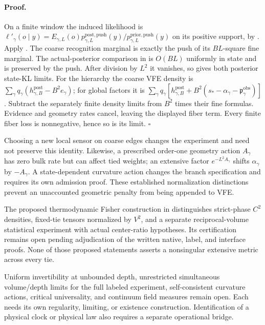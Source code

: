 \paragraph{Proof.}
On a finite window the induced likelihood is
$\ell'_\gamma(o\mid y)=E_{\gamma,L}(o)
 p_{\gamma,L}^{\mathrm{post,push}}(y)/p_{\gamma,L}^{\mathrm{prior,push}}(y)$
on its positive support, by .
Apply . The coarse recognition marginal
is exactly the push of its $BL$-square fine marginal. The actual-posterior
comparison in  is $O(BL)$ uniformly in
state and is preserved by the push. After division by $L^2$ it vanishes,
so  gives both posterior state-KL
limits. For the hierarchy the coarse VFE density is
$\sum_\gamma q_\gamma(h^{\mathrm{post}}_{\gamma,B}-B^2e_\gamma)$;
for global factors it is
$\sum_\gamma q_\gamma[h^{\mathrm{post}}_{\gamma,B}
 +B^2(s_*-\alpha_\gamma-\mathfrak p_\gamma^{\mathrm{obs}})]$.
Subtract the separately finite density limits from $B^2$ times their fine
formulas. Evidence and geometry rates cancel, leaving the displayed fiber
term. Every finite fiber loss is nonnegative, hence so is its limit.
$\square$

Choosing a new local sensor on coarse edges changes the experiment and
need not preserve this identity. Likewise, a prescribed order-one
geometry action $A_\gamma$ has zero bulk rate but can affect tied weights;
an extensive factor $e^{-L^2A_\gamma}$ shifts $\alpha_\gamma$ by
$-A_\gamma$. A state-dependent curvature action changes the branch
specification and requires its own admission proof. These established
normalization distinctions prevent an unaccounted geometric penalty from
being appended to VFE. 

The proposed thermodynamic Fisher construction in
 distinguishes strict-phase $C^2$
densities, fixed-tie tensors normalized by $V^2$, and a separate
reciprocal-volume statistical experiment with actual center-ratio
hypotheses. Its certification remains open pending adjudication of the
written native, label, and interface proofs. None of those proposed
statements asserts a nonsingular extensive metric across every tie.

Uniform invertibility at unbounded depth, unrestricted simultaneous
volume/depth limits for the full labeled experiment, self-consistent
curvature actions, critical universality, and continuum field measures
remain open. Each needs its own regularity, limiting, or existence
construction. Identification of a physical clock or physical law also
requires a separate operational bridge. 
